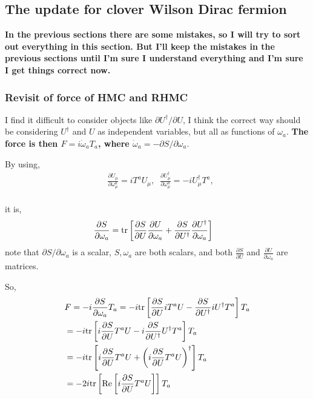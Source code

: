 \subsection{\label{sec:cw}The update for clover Wilson Dirac fermion}

\textbf{\textcolor[rgb]{1,0,0}{In the previous sections there are some mistakes, so I will try to sort out everything in this section. But I'll keep the mistakes in the previous sections until I'm sure I understand everything and I'm sure I get things correct now.}}


\subsubsection{\label{sec:cw.rhmcAndHmc}Revisit of force of HMC and RHMC}

I find it difficult to consider objects like $\partial U^{\dagger} / \partial U$, I think the correct way should be considering $U^{\dagger}$ and $U$ as independent variables, but all as functions of $\omega _a$. \textcolor[rgb]{0,0,1}{\textbf{The force is then $F=i\dot{\omega }_aT_a$, where $\dot{\omega}_a=-\partial S/\partial \omega _a$}}.

By using,
\begin{equation}
\begin{split}
&\frac{\partial U_{\mu}}{\partial \omega_{\mu}^a}=iT^aU_{\mu},\;\;\frac{\partial U^{\dagger}_{\mu}}{\partial \omega_{\mu}^a}=-iU^{\dagger}_{\mu}T^a,\\
\end{split}
\end{equation}

it is,
\begin{equation}
\begin{split}
&\frac{\partial S}{\partial \omega _a}={\rm tr}\left[\frac{\partial S}{\partial U}\frac{\partial U}{\partial \omega_a}+\frac{\partial S}{\partial U^{\dagger}}\frac{\partial U^{\dagger}}{\partial \omega_a}\right]
\end{split}
\end{equation}
note that $\partial S/\partial \omega _a$ is a scalar, $S,\omega _a$ are both scalars, and both $\frac{\partial S}{\partial U}$ and $\frac{\partial U}{\partial \omega_a}$ are matrices.

So,
\begin{equation}
\begin{split}
&F=-i\frac{\partial S}{\partial \omega _a}T_a=-i{\rm tr}\left[\frac{\partial S}{\partial U}iT^aU-\frac{\partial S}{\partial U^{\dagger}}iU^{\dagger}T^a\right]T_a\\
&=-i{\rm tr}\left[i\frac{\partial S}{\partial U}T^aU-i\frac{\partial S}{\partial U^{\dagger}}U^{\dagger}T^a\right]T_a\\
&=-i{\rm tr}\left[i\frac{\partial S}{\partial U}T^aU+\left(i\frac{\partial S}{\partial U}T^aU\right)^{\dagger}\right]T_a\\
&=-2i{\rm tr}\left[{\rm Re}\left[i\frac{\partial S}{\partial U}T^aU\right]\right]T_a\\
\end{split}
\end{equation}

